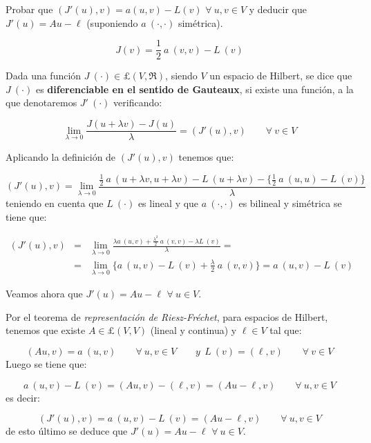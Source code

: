 \begin{ejercicio}
Probar que $(J'(u),v)=a(u,v)-L(v)$ $\forall \ u,v \in V$ y deducir que
$J'(u) = Au-\ell$ (suponiendo $a\ (\cdot ,\cdot )$ sim\'etrica).
\end{ejercicio}

\begin{demosejer}
\begin{displaymath}
J(v) = \frac{1}{2}\ a\ (v,v)- L\ (v)
\end{displaymath}

Dada una funci\'on $J\ (\cdot) \in \pounds(V,\Re )$, siendo $V$ un espacio de
Hilbert, se dice que $J\ (\cdot)$ es \textbf{diferenciable en el sentido de
Gauteaux}, si existe una funci\'on, a la que denotaremos $J'\ (\cdot)$
verificando:

\begin{equation} \label{eq:defigateaux}
\lim_{\lambda \to 0} \frac{J(u+\lambda v)-J(u)}{\lambda} = (J'(u), v)
\qquad \forall \ v \in V
\end{equation}

Aplicando la definici\'on de $(J'(u),v)$ tenemos que:

\begin{displaymath}
(J'(u),v) = \lim_{\lambda \to 0} \frac{\frac{1}{2}\ a\ (u+\lambda v,u+\lambda
v)-L\ (u+\lambda v)-\{ \frac{1}{2}\ a\ (u,u)-L\ (v)\}}{\lambda}
\end{displaymath}
teniendo en cuenta que $L\ (\cdot)$ es lineal y que $a\ (\cdot ,\cdot )$ es
bilineal y sim\'etrica se tiene que:

\begin{eqnarray*}
(J'(u),v) & = & \lim_{\lambda \to 0} \frac{\lambda a\ (u,v)+
\frac{\lambda^2}{2}\ a\ (v,v)-\lambda L\ (v)}{\lambda} = \\
& = & \lim_{\lambda \to 0} \{ a\ (u,v)-L\ (v)+\frac{\lambda}{2}\ a\ (v,v) \} =
a\ (u,v) - L\ (v)
\end{eqnarray*}

Veamos ahora que $J'(u) = Au - \ell$ $\forall \ u \in V$.\newline

Por el teorema de \emph{representaci\'on de Riesz-Fr\'echet}, para espacios
de Hilbert, tenemos que existe $A \in \pounds(V,V)$ (lineal y continua) y
$\ell \in V$ tal que:

\begin{displaymath}
(Au,v) = a\ (u,v)\qquad \forall \ u,v \in V \qquad y\ \ L\ (v)=(\ell , v)
\qquad \forall \ v \in V
\end{displaymath}
Luego se tiene que:

\begin{displaymath}
a\ (u,v) - L\ (v) = (Au,v) - (\ell ,v) = (Au-\ell , v)\qquad \forall \
u,v \in V
\end{displaymath}
es decir:

\begin{displaymath}
(J'(u),v) = a\ (u,v) - L\ (v) = (Au-\ell , v) \qquad \forall \ u,v \in V
\end{displaymath}
de esto \'ultimo se deduce que $J'(u)= Au -\ell$ $\forall \ u \in V$.

\end{demosejer}

